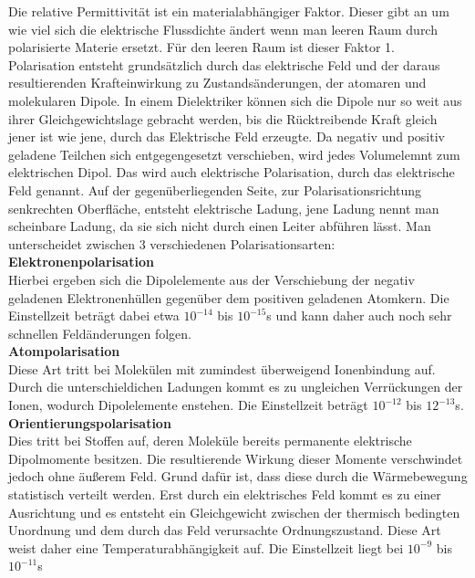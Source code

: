 \documentclass[a4paper,twoside,12pt,DIV=13,BCOR=5mm,numbers=noenddot,cleardoublepage=empty]{scrbook}
\begin{document}
    Die relative Permittivit\"at ist ein materialabh\"angiger Faktor. 
    Dieser gibt an um wie viel sich die elektrische Flussdichte \"andert 
    wenn man leeren Raum durch polarisierte Materie ersetzt. F\"ur den leeren 
    Raum ist dieser Faktor 1.
    \\
    Polarisation entsteht grunds\"atzlich durch das elektrische Feld und 
    der daraus resultierenden Krafteinwirkung zu Zustands\"anderungen, der 
    atomaren und molekularen Dipole. In einem Dielektriker k\"onnen sich die 
    Dipole nur so weit aus ihrer Gleichgewichtslage gebracht werden, bis die 
    R\"ucktreibende Kraft gleich jener ist wie jene, durch das Elektrische 
    Feld erzeugte. Da negativ und positiv geladene Teilchen sich 
    entgegengesetzt verschieben, wird jedes Volumelemnt zum elektrischen Dipol. 
    Das wird auch elektrische Polarisation, durch das elektrische Feld genannt. 
    Auf der gegen\"uberliegenden Seite, zur Polarisationsrichtung senkrechten 
    Oberfl\"ache, entsteht elektrische Ladung, jene Ladung nennt man scheinbare 
    Ladung, da sie sich nicht durch einen Leiter abf\"uhren l\"asst.
    Man unterscheidet zwischen 3 verschiedenen Polarisationsarten:\\
    \textbf{Elektronenpolarisation}\\
    Hierbei ergeben sich die Dipolelemente aus der Verschiebung der 
    negativ geladenen Elektronenh\"ullen gegen\"uber dem positiven geladenen 
    Atomkern. Die Einstellzeit betr\"agt dabei etwa $10^{-14}$ bis $10^{-15}$s 
    und kann daher auch noch sehr schnellen Feld\"anderungen folgen.\\
    \textbf{Atompolarisation}\\
    Diese Art tritt bei Molek\"ulen mit zumindest \"uberweigend 
    Ionenbindung auf. Durch die unterschieldichen Ladungen kommt es zu 
    ungleichen Verr\"uckungen der Ionen, wodurch Dipolelemente enstehen. Die 
    Einstellzeit betr\"agt $10^{-12}$ bis $12^{-13}$s.\\
    \textbf{Orientierungspolarisation}\\
    Dies tritt bei Stoffen auf, deren Molek\"ule bereits permanente elektrische Dipolmomente besitzen. Die resultierende Wirkung dieser Momente verschwindet jedoch ohne \"au\ss{}erem Feld. Grund daf\"ur ist, dass diese durch die W\"armebewegung statistisch verteilt werden.
    Erst durch ein elektrisches Feld kommt es zu einer Ausrichtung und es entsteht ein Gleichgewicht zwischen der thermisch bedingten Unordnung und dem durch das Feld verursachte Ordnungszustand. 
    Diese Art weist daher eine Temperaturabh\"angigkeit auf. Die Einstellzeit 
    liegt bei $10^{-9}$ bis $10^{-11}$s
    \pagebreak
\end{document}
